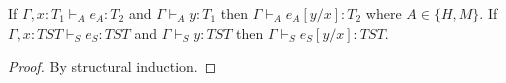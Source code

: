 \begin{lemma}
\label{tms}
\onehalfspacing
If $\Gamma,x:T_{1}\vdash_{A}e_{A}:T_{2}$ and $\Gamma\vdash_{A}y:T_{1}$ then $\Gamma\vdash_{A}e_{A}[y/x]:T_{2}$ where $A\in\lbrace H,M\rbrace$.  If $\Gamma,x:TST\vdash_{S}e_{S}:TST$ and $\Gamma\vdash_{S}y:TST$ then $\Gamma\vdash_{S}e_{S}[y/x]:TST$.
\begin{proof}
By structural induction.
\end{proof}
\end{lemma}